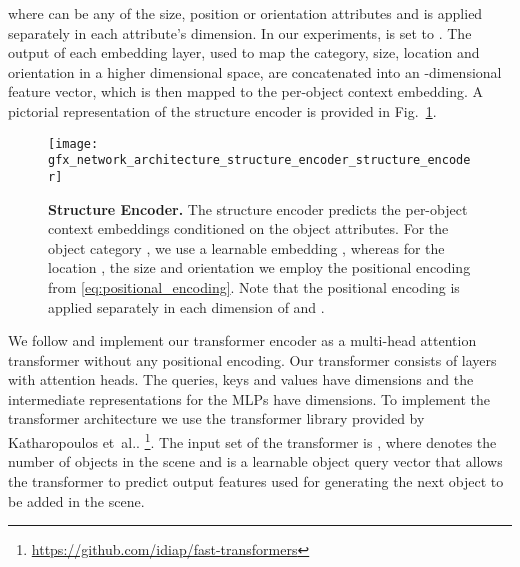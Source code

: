 \documentclass{article}
\makeatletter
\DeclareRobustCommand\onedot{\futurelet\@let@token\@onedot}
\def\@onedot{\ifx\@let@token.\else.\null\fi\xspace}
\def\etal{et~al\onedot}
\newcommand{\boldparagraph}[1]{\vspace{0.2cm}\noindent{\bf #1:} }
\newcommand{\figref}[1]{Fig.~\ref{#1}}
\makeatother
\begin{document}
where  can be any of the size, position or orientation attributes and
 is applied separately in each attribute's dimension. In our
experiments,  is set to . The output of each embedding layer, used to map the
category, size, location and orientation in a higher dimensional space, are
concatenated into an -dimensional feature vector, which is then mapped
to the per-object context embedding.
A pictorial representation
of the structure encoder is provided in \figref{fig:structure_encoder}.
\begin{figure}
    \centering
    \texttt{[image: gfx\_network\_architecture\_structure\_encoder\_structure\_encoder]}
    \caption{{\bf{Structure Encoder.}} The structure encoder predicts the
    per-object context embeddings  conditioned on the object attributes.
    For the object category , we use a learnable embedding
    , whereas for the location , the size  and
    orientation  we employ the positional encoding from
    \eqref{eq:positional_encoding}.
    Note that the positional encoding  is applied separately in
    each dimension of  and .}
    \label{fig:structure_encoder}
    \vspace{-0.8em}
\end{figure}

\boldparagraph{Transformer Encoder}We follow \cite{Vaswani2017NIPS, Devlin2019NAACL} and implement our transformer 
encoder as a multi-head attention transformer without any positional
encoding. Our transformer consists of  layers with  attention heads. The
queries, keys and values have  dimensions and the intermediate
representations for the MLPs have  dimensions. To implement the
transformer architecture we use the transformer library provided by Katharopoulos \etal
\cite{Katharopoulos2020ICML}\footnote{\href{https://github.com/idiap/fast-transformers}{https://github.com/idiap/fast-transformers}}.
The input set of the transformer is , where  denotes the number of
objects in the scene and  is a learnable object
query vector that allows the transformer to predict output features
 used for generating the next object to be added
in the scene.
\end{document}
